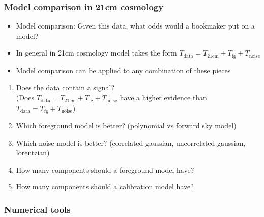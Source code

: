 \documentclass[aspectratio=169]{beamer}
\begin{document}
\begin{frame}
    \frametitle{Model comparison in 21cm cosmology}
    \begin{itemize}
        \item Model comparison: Given this data, what odds would a bookmaker put on a model?
        \item In general in 21cm cosmology model takes the form $T_\text{data} = T_\text{21cm} + T_\text{fg} + T_\text{noise}$ 
        \item Model comparison can be applied to any combination of these pieces
    \end{itemize}
    \begin{enumerate}
        \item Does the data contain a signal? \\(Does $T_\text{data} = T_\text{21cm} + T_\text{fg} + T_\text{noise}$ have a higher evidence than $T_\text{data} = T_\text{fg} + T_\text{noise}$)
        \item Which foreground model is better? (polynomial vs forward sky model)
        \item Which noise model is better? (correlated gaussian, uncorrelated gaussian, lorentzian)
        \item How many components should a foreground model have?
        \item How many components should a calibration model have?
    \end{enumerate}
\end{frame}


\begin{frame}
    \frametitle{Numerical tools}
    
\end{frame}
\end{document}
